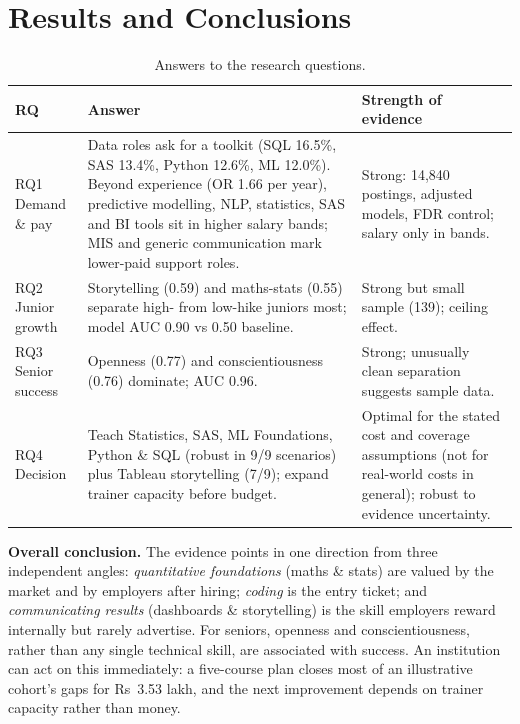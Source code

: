 \section{Results and Conclusions}\label{sec:results}

\begin{table}[H]\centering\small
\caption{Answers to the research questions.}\label{tab:answers}
\begin{tabularx}{\linewidth}{@{}L{2.1cm}Y L{3.8cm}@{}}
\toprule
RQ & Answer & Strength of evidence\\
\midrule
RQ1 Demand \& pay & Data roles ask for a toolkit (SQL 16.5\%, SAS 13.4\%, Python 12.6\%, ML 12.0\%).
Beyond experience (OR 1.66 per year), predictive modelling, NLP, statistics, SAS and BI tools sit in
higher salary bands; MIS and generic communication mark lower-paid support roles. &
Strong: 14,840 postings, adjusted models, FDR control; salary only in bands.\\
\addlinespace
RQ2 Junior growth & Storytelling (0.59) and maths-stats (0.55) separate high- from low-hike juniors
most; model AUC 0.90 vs 0.50 baseline. & Strong but small sample (139); ceiling effect.\\
\addlinespace
RQ3 Senior success & Openness (0.77) and conscientiousness (0.76) dominate; AUC 0.96. & Strong;
unusually clean separation suggests sample data.\\
\addlinespace
RQ4 Decision & Teach Statistics, SAS, ML Foundations, Python \& SQL (robust in 9/9 scenarios) plus
Tableau storytelling (7/9); expand trainer capacity before budget. & Optimal for the stated cost and
coverage assumptions (not for real-world costs in general); robust to evidence uncertainty.\\
\bottomrule
\end{tabularx}
\end{table}

\textbf{Overall conclusion.} The evidence points in one direction from three independent angles:
\emph{quantitative foundations} (maths \& stats) are valued by the market and by employers after
hiring; \emph{coding} is the entry ticket; and \emph{communicating results} (dashboards \&
storytelling) is the skill employers reward internally but rarely advertise. For seniors, openness
and conscientiousness, rather than any single technical skill, are associated with success. An
institution can act on this immediately: a five-course plan closes most of an illustrative cohort's
gaps for Rs~3.53 lakh, and the next improvement depends on trainer capacity rather than money.

